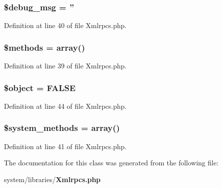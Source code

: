 \subsubsection[{\$debug\-\_\-msg}]{\setlength{\rightskip}{0pt plus 5cm}\$debug\-\_\-msg = ''}\label{class_c_i___xmlrpcs_afed2f9c39f2e406bcdff222ce412bda8}


Definition at line 40 of file Xmlrpcs.\-php.

\subsubsection[{\$methods}]{\setlength{\rightskip}{0pt plus 5cm}\$methods = array()}\label{class_c_i___xmlrpcs_a802753499268a04da139bd6e6ef89b35}


Definition at line 39 of file Xmlrpcs.\-php.

\subsubsection[{\$object}]{\setlength{\rightskip}{0pt plus 5cm}\$object = F\-A\-L\-S\-E}\label{class_c_i___xmlrpcs_a52123b83a1952a68c5513e47d59ec4a6}


Definition at line 44 of file Xmlrpcs.\-php.

\subsubsection[{\$system\-\_\-methods}]{\setlength{\rightskip}{0pt plus 5cm}\$system\-\_\-methods = array()}\label{class_c_i___xmlrpcs_a07c837152d76c5e72b0bd7a065fa9c10}


Definition at line 41 of file Xmlrpcs.\-php.



The documentation for this class was generated from the following file\-:\begin{DoxyCompactItemize}
\item 
system/libraries/{\bf Xmlrpcs.\-php}\end{DoxyCompactItemize}
